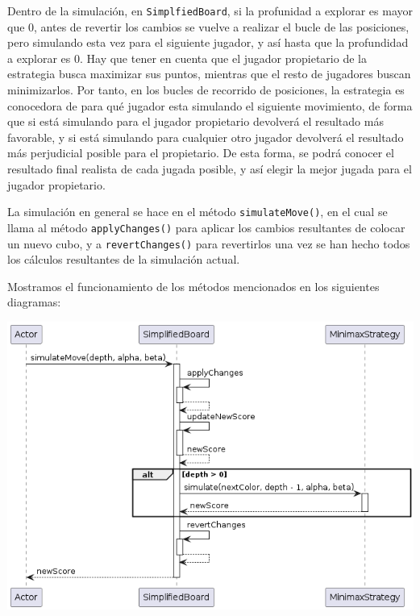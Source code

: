 \documentclass[../DocumentoOficial.tex]{subfiles}
\begin{document}
Dentro de la simulación, en \texttt{SimplfiedBoard}, si la profunidad a explorar es mayor que 0, antes de revertir los cambios se vuelve a realizar el bucle de las posiciones, pero simulando esta vez para el siguiente jugador, y así hasta que la profundidad a explorar es 0. Hay que tener en cuenta que el jugador propietario de la estrategia busca maximizar sus puntos, mientras que el resto de jugadores buscan minimizarlos. Por tanto, en los bucles de recorrido de posiciones, la estrategia es conocedora de para qué jugador esta simulando el siguiente movimiento, de forma que si está simulando para el jugador propietario devolverá el resultado más favorable, y si está simulando para cualquier otro jugador devolverá el resultado más perjudicial posible para el propietario. De esta forma, se podrá conocer el resultado final realista de cada jugada posible, y así elegir la mejor jugada para el jugador propietario.

La simulación en general se hace en el método \texttt{simulateMove()}, en el cual se llama al método \texttt{applyChanges()} para aplicar los cambios resultantes de colocar un nuevo cubo, y a \texttt{revertChanges()} para revertirlos una vez se han hecho todos los cálculos resultantes de la simulación actual.

Mostramos el funcionamiento de los métodos mencionados en los siguientes diagramas:

\begin{center}
\includegraphics[scale=0.6]{SimplifiedBoard.simulateMove()-sprint7.png} 
\end{center}
\newpage
\end{document}
